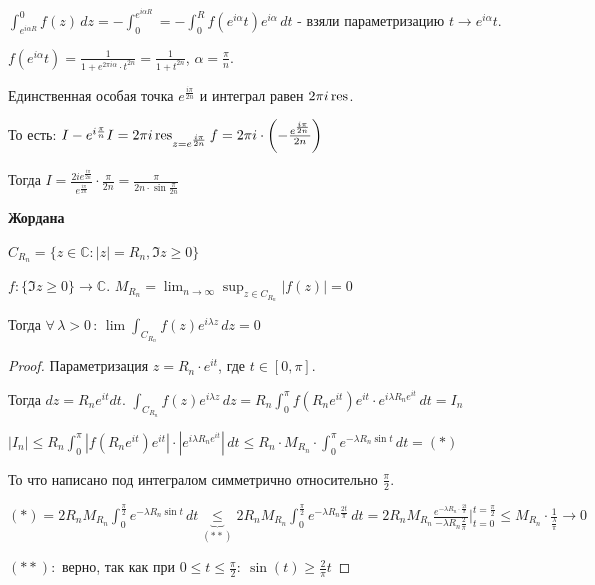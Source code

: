 \begin{example}
\begin{enumerate}
{            $\int_{e^{i\alpha R}}^{0} f(z) \, dz = -\int_{0}^{e^{i \alpha R}} = -\int_{0}^{R} f(e^{i \alpha} t) e^{i \alpha} \, dt$ -
            взяли параметризацию $t \to e^{i \alpha} t$.

            $f(e^{i \alpha}t) = \frac{1}{1 + e^{2 \pi i \alpha} \cdot t^{2n}} = \frac{1}{1 + t^{2n}}$, $\alpha = \frac{\pi}{n}$.

            Единственная особая точка $e^{\frac{i \pi}{2n}}$ и интеграл равен
            $2 \pi i \operatorname{res}$.

            То есть: $I - e^{i \frac{\pi }{n}} I = 2 \pi i \operatorname{res}_{z = e^{\frac{i \pi}{2n}}} f = 2 \pi i \cdot \left ( - \frac{e^{\frac{i \pi}{2n}}}{2n}  \right )$

            Тогда $I = \frac{2 i e^{\frac{i \pi}{2n}}}{e^{\frac{i \pi}{2n}}} \cdot \frac{\pi}{2n} = \frac{\pi}{2n \cdot \sin \frac{\pi}{2n}}$
        }
    \end{enumerate}
\end{example}

\begin{lemma}
    \textbf{Жордана}

    $C_{R_n} = \{ z \in \mathbb{C} : |z| = R_n, \Im z \geqslant 0 \}$

    $f : \{ \Im z \geqslant 0 \} \to \mathbb{C}$. $M_{R_n} = \lim_{n \to \infty} \sup_{z \in C_{R_n}} |f(z)| = 0$

    Тогда $\forall \, \lambda > 0 \, : \, \lim \int_{C_{R_n}} f(z) e^{i \lambda z} \, dz = 0$
\end{lemma}

\begin{proof}
    Параметризация $z = R_n \cdot e^{it}$, где $t \in [0, \pi]$.

    Тогда $dz = R_n e^{it} dt$.
    $\int_{C_{R_n}} f(z) e^{i \lambda z} \, dz = R_n \int_{0}^{\pi} f(R_n e^{it}) e^{it} \cdot e^{i \lambda R_n e^{it}} \, dt = I_n$

    $|I_n| \leqslant  R_n \int_{0}^{\pi} |f(R_n e^{it}) e^{it}| \cdot |e^{i \lambda R_n e^{it}}| \, dt \leqslant R_n \cdot M_{R_n} \cdot \int_{0}^{\pi} e^{- \lambda R_n \sin t} \, dt = (*) $

    То что написано под интегралом симметрично относительно $\frac{\pi}{2}$.

    $(*) = 2R_n M_{R_n} \int_{0}^{\frac{\pi}{2}} e^{-\lambda R_n \sin t} \, dt \underbrace{\leqslant}_{(**)}
    2R_n M_{R_n} \int_{0}^{\frac{\pi}{2}} e^{-\lambda R_n \frac{2t}{\pi}} \, dt = 2R_n M_{R_n} \frac{e^{-\lambda R_n \cdot \frac{2t}{\pi}}}{-\lambda R_n \frac{2}{\pi}} \bigg |_{t = 0}^{t = \frac{\pi}{2}}
    \leqslant M_{R_n} \cdot \frac{1}{\frac{\lambda}{\pi}} \rightarrow 0$

    $(**): $ верно, так как при $0 \leq t \leq \frac{\pi}{2}: \ \sin(t) \geq \frac{2}{\pi} t$
\end{proof}

